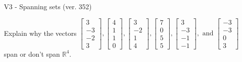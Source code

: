\begin{exercise}
  \begin{exerciseTitle}V3 - Spanning sets (ver. 352)\end{exerciseTitle}
  \begin{exerciseStatement}
    Explain why the vectors \(\left[\begin{array}{r}
3 \\
-3 \\
-2 \\
3
\end{array}\right] , \left[\begin{array}{r}
4 \\
1 \\
1 \\
0
\end{array}\right] , \left[\begin{array}{r}
3 \\
-2 \\
1 \\
4
\end{array}\right] , \left[\begin{array}{r}
7 \\
0 \\
5 \\
5
\end{array}\right] , \left[\begin{array}{r}
3 \\
-3 \\
-1 \\
-1
\end{array}\right] , \text{ and } \left[\begin{array}{r}
-3 \\
-3 \\
0 \\
3
\end{array}\right]\) span or don't span \(\mathbb{R}^4\). 
	



\end{exerciseStatement}
\end{exercise}
